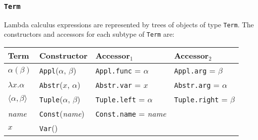 \documentclass[11pt]{article}
\begin{document}
\newpage
\subsubsection{\texttt{Term}}

Lambda calculus expressions are represented by trees of objects of
type \texttt{Term}.  The constructors and accessors for each subtype
of
\texttt{Term} are:

\vspace{3mm}
\begin{tabular}{l|lll}
Term \hspace{1cm} & Constructor \hspace{1cm} 
  & Accessor$_1$ & Accessor$_2$\\
\hline
$\alpha(\beta)$ & \texttt{Appl}($\alpha$, $\beta$) 
  & \texttt{Appl.func} = $\alpha$ & \texttt{Appl.arg} = $\beta$ \\
$\lambda x.\alpha$ & \texttt{Abstr}($x$, $\alpha$) 
  & \texttt{Abstr.var} = $x$ & \texttt{Abstr.arg} = $\alpha$ \\
$\langle\alpha,\beta\rangle$ & \texttt{Tuple}($\alpha$, $\beta$)
  & \texttt{Tuple.left} = $\alpha$ & \texttt{Tuple.right} = $\beta$\\
\textit{name} & \texttt{Const}(\textit{name}) 
  & \texttt{Const.name} = \textit{name} & \\
$x$& \texttt{Var}() & & \\
\end{tabular}
\end{document}
